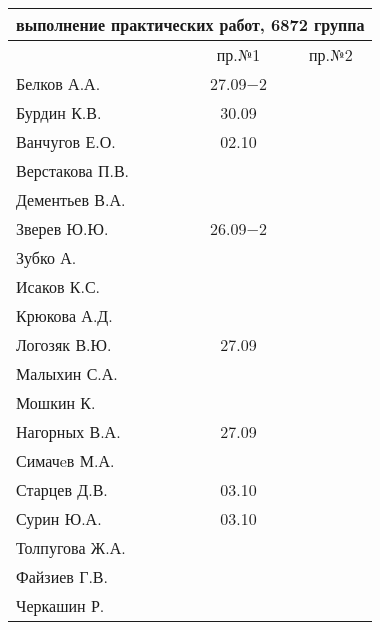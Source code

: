 \documentclass[a4paper,11pt]{article}
\begin{document}
\newpage
\begin{tabular}{l|cc}
\multicolumn{3}{c}{выполнение практических работ, 6872 группа} \\
\toprule
& пр.№1 & пр.№2 \\
\midrule
Белков А.А.    &27.09$-2$&     \\   
Бурдин К.В.    &30.09    &     \\
Ванчугов Е.О.  &02.10    &     \\
Верстакова П.В.&         &     \\
Дементьев В.А. &         &     \\
Зверев Ю.Ю.    &26.09$-2$&     \\
Зубко А.       &         &     \\
Исаков К.С.    &         &     \\
Крюкова А.Д.   &         &     \\
Логозяк В.Ю.   &27.09    &     \\
Малыхин С.А.   &         &     \\
Мошкин К.      &         &     \\
Нагорных В.А.  &27.09    &     \\
Симачeв М.А.   &         &     \\
Старцев Д.В.   &03.10    &     \\
Сурин Ю.А.     &03.10    &     \\
Толпугова Ж.А. &         &     \\
Файзиев Г.В.   &         &     \\
Черкашин Р.    &         &     \\
\bottomrule
\end{tabular}
\end{document}
